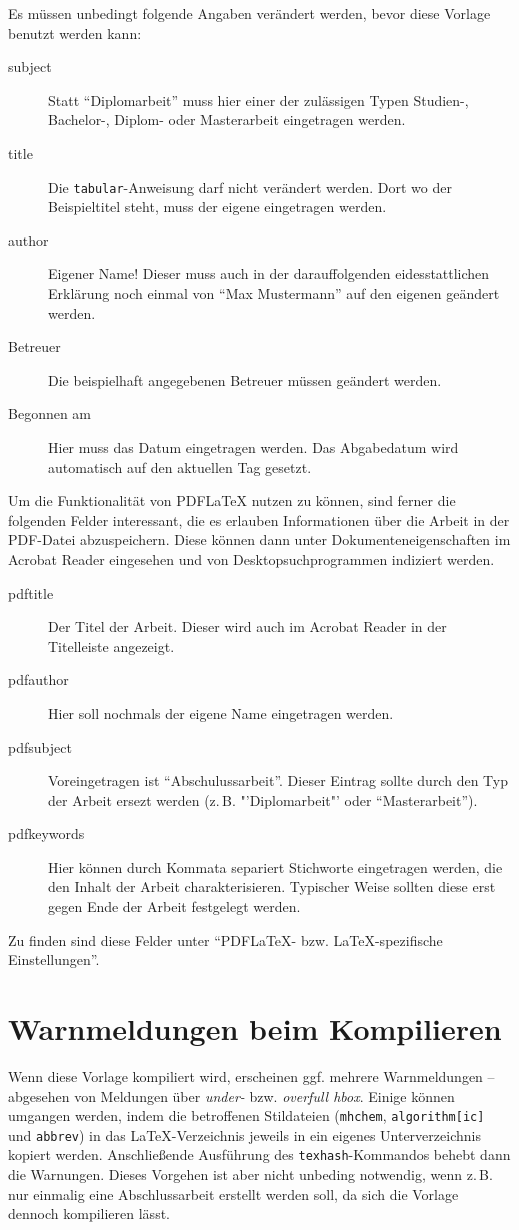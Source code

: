 Es müssen unbedingt folgende Angaben verändert werden, bevor diese Vorlage
benutzt werden kann:
\begin{description}
 \item[subject] Statt "`Diplomarbeit"' muss hier einer der zulässigen
 Typen Studien-, Bachelor-, Diplom- oder Masterarbeit eingetragen werden.
 \item[title] Die \verb!tabular!-Anweisung darf nicht verändert werden. Dort
 wo der Beispieltitel steht, muss der eigene eingetragen werden.
 \item[author] Eigener Name! Dieser muss auch in der darauffolgenden
 eidesstattlichen Erklärung noch einmal von "`Max Mustermann"' auf den eigenen
 geändert werden.
 \item[Betreuer] Die beispielhaft angegebenen Betreuer müssen geändert werden.
 \item[Begonnen am] Hier muss das Datum eingetragen werden. Das Abgabedatum wird
 automatisch auf den aktuellen Tag gesetzt.
\end{description}
Um die Funktionalität von PDF\LaTeX{} nutzen zu können, sind ferner die
folgenden Felder interessant, die es erlauben Informationen über die Arbeit in
der PDF-Datei abzuspeichern. Diese können dann unter Dokumenteneigenschaften im
Acrobat Reader eingesehen und von Desktopsuchprogrammen indiziert werden.
\begin{description}
 \item[pdftitle] Der Titel der Arbeit. Dieser wird auch im Acrobat Reader in
der Titelleiste angezeigt.
 \item[pdfauthor] Hier soll nochmals der eigene Name eingetragen werden.
 \item[pdfsubject] Voreingetragen ist "`Abschulussarbeit"'. Dieser Eintrag
sollte durch den Typ der Arbeit ersezt werden (z.\,B. "'Diplomarbeit"' oder
"`Masterarbeit"').
 \item[pdfkeywords] Hier können durch Kommata separiert Stichworte eingetragen
werden, die den Inhalt der Arbeit charakterisieren. Typischer Weise sollten
diese erst gegen Ende der Arbeit festgelegt werden.
\end{description}
Zu finden sind diese Felder unter "`PDF\LaTeX- bzw. \LaTeX-spezifische
Einstellungen"'.


\section{Warnmeldungen beim Kompilieren}

Wenn diese Vorlage kompiliert wird, erscheinen ggf. mehrere Warnmeldungen --
abgesehen von Meldungen über \textit{under-} bzw. \textit{overfull hbox}.
Einige können umgangen werden, indem die betroffenen Stildateien (\texttt{mhchem},
\texttt{algorithm[ic]} und \texttt{abbrev}) in das \LaTeX-Verzeichnis jeweils
in ein eigenes Unterverzeichnis kopiert werden. Anschließende Ausführung des
\verb!texhash!-Kommandos behebt dann die Warnungen. Dieses Vorgehen ist aber
nicht unbeding notwendig, wenn z.\,B. nur einmalig eine Abschlussarbeit erstellt
werden soll, da sich die Vorlage dennoch kompilieren lässt.

